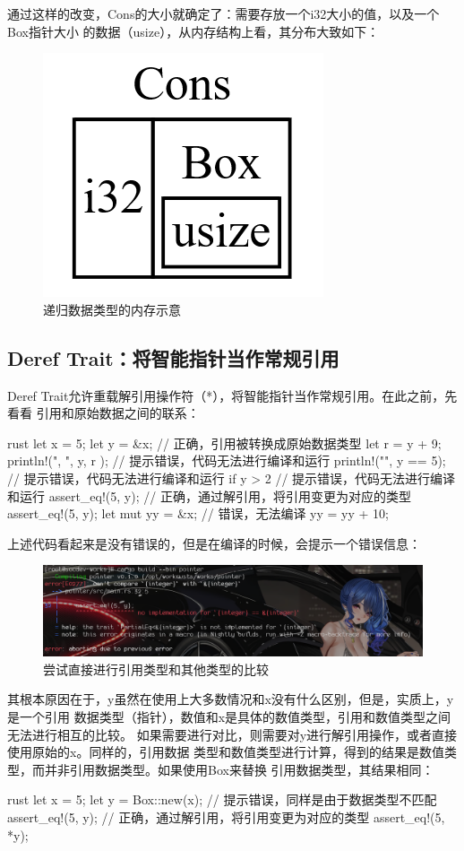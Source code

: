 通过这样的改变，Cons的大小就确定了：需要存放一个i32大小的值，以及一个Box指针大小
的数据（usize），从内存结构上看，其分布大致如下：
\begin{figure}[H]
  \centering
  \includegraphics[scale=0.4]{rust_box.png}
  \caption{递归数据类型的内存示意}
  \label{fig:rust_box}
\end{figure}

\subsection{Deref Trait：将智能指针当作常规引用}
Deref Trait允许重载解引用操作符（*），将智能指针当作常规引用。在此之前，先看看
引用和原始数据之间的联系：
\begin{code-block}{rust}
let x = 5;
let y = &x;
// 正确，引用被转换成原始数据类型
let r = y + 9;
println!("{}, {}", y, r );
// 提示错误，代码无法进行编译和运行
println!("{}", y == 5);
// 提示错误，代码无法进行编译和运行
if y > 2 {
}
// 提示错误，代码无法进行编译和运行
assert_eq!(5, y);
// 正确，通过解引用，将引用变更为对应的类型
assert_eq!(5, y);
let mut yy = &x;
// 错误，无法编译
yy = yy + 10;
\end{code-block}
上述代码看起来是没有错误的，但是在编译的时候，会提示一个错误信息：
\begin{figure}[H]
  \centering
  \includegraphics[width=\linewidth]{rust_pointer_error.png}
  \caption{尝试直接进行引用类型和其他类型的比较}
  \label{fig:rust_pointer_error}
\end{figure}
其根本原因在于，y虽然在使用上大多数情况和x没有什么区别，但是，实质上，y是一个引用
数据类型（指针），数值和x是具体的数值类型，引用和数值类型之间无法进行相互的比较。
如果需要进行对比，则需要对y进行解引用操作，或者直接使用原始的x。同样的，引用数据
类型和数值类型进行计算，得到的结果是数值类型，而并非引用数据类型。如果使用Box来替换
引用数据类型，其结果相同：
\begin{code-block}{rust}
let x = 5;
let y = Box::new(x);
// 提示错误，同样是由于数据类型不匹配
assert_eq!(5, y);
// 正确，通过解引用，将引用变更为对应的类型
assert_eq!(5, *y);
\end{code-block}

